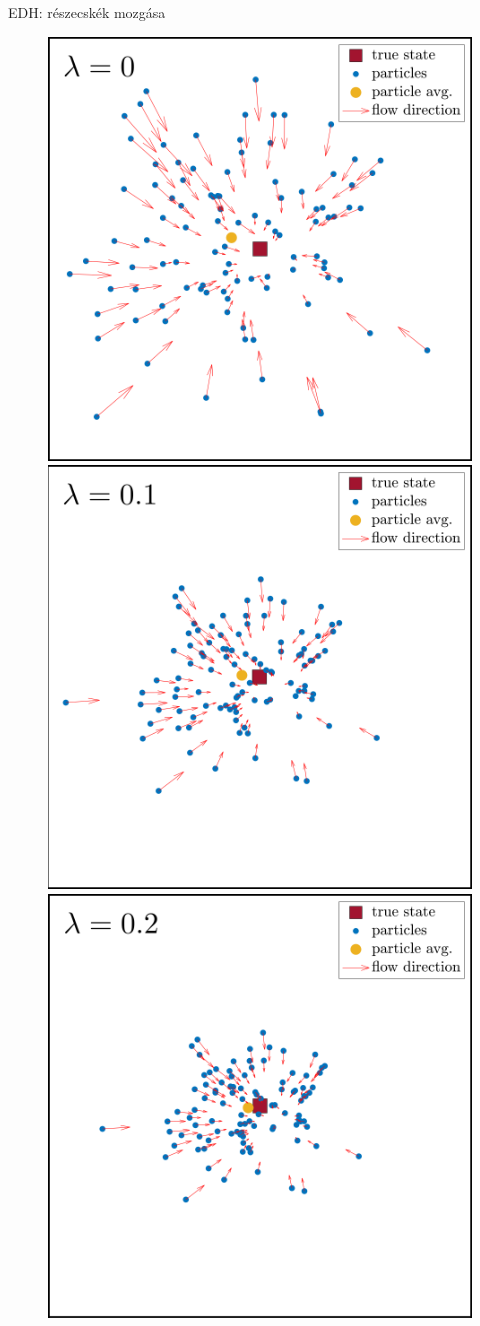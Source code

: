 \documentclass{beamer}
\begin{document}
\begin{frame}{EDH: részecskék mozgása}
    \begin{overlayarea}{\textwidth}{\textheight}
        \begin{figure}
            \centering
            {%
                \includegraphics[width=.6\textwidth]{_Figures/l0.png}%
            }%
            {%
                \includegraphics[width=.6\textwidth]{_Figures/l01.png}%
            }%
            {%
                \includegraphics[width=.6\textwidth]{_Figures/l02.png}%
}
\end{figure}
\end{overlayarea}
\end{frame}
\end{document}
